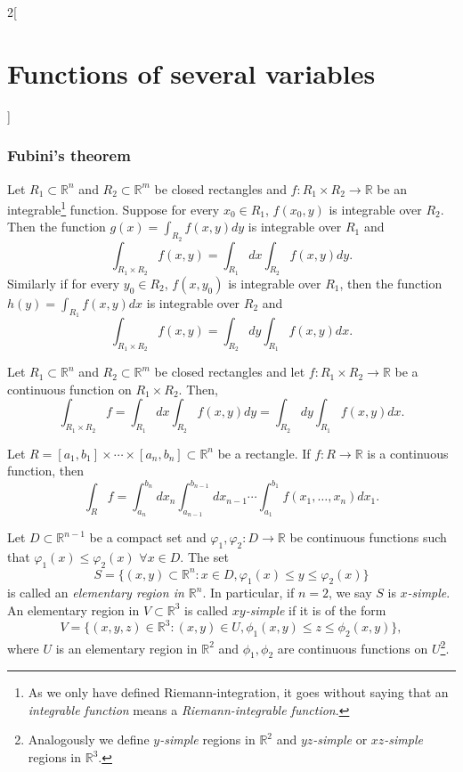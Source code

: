 \documentclass[class=article,10pt,crop=false]{standalone}
\begin{document}
\begin{multicols}{2}[\section{Functions of several variables}]
\subsubsection*{Fubini's theorem}
\begin{theorem}
Let $R_1\subset\mathbb{R}^n$ and $R_2\subset\mathbb{R}^m$ be closed rectangles and $f:R_1\times R_2\rightarrow\mathbb{R}$ be an integrable\footnote{As we only have defined Riemann-integration, it goes without saying that an \textit{integrable function} means a \textit{Riemann-integrable function}.} function. Suppose for every $x_0\in R_1$, $f(x_0,y)$ is integrable over $R_2$. Then the function $\displaystyle g(x)=\int_{R_2}f(x,y)dy$ is integrable over $R_1$ and $$\int_{R_1\times R_2}f(x,y)=\int_{R_1}dx\int_{R_2}f(x,y)dy.$$ Similarly if for every $y_0\in R_2$, $f(x,y_0)$ is integrable over $R_1$, then the function $\displaystyle h(y)=\int_{R_1}f(x,y)dx$ is integrable over $R_2$ and $$\int_{R_1\times R_2}f(x,y)=\int_{R_2}dy\int_{R_1}f(x,y)dx.$$
\begin{corollary}
Let $R_1\subset\mathbb{R}^n$ and $R_2\subset\mathbb{R}^m$ be closed rectangles and let $f:R_1\times R_2\rightarrow\mathbb{R}$ be a continuous function on $R_1\times R_2$. Then, $$\int_{R_1\times R_2}f=\int_{R_1}dx\int_{R_2}f(x,y)dy=\int_{R_2}dy\int_{R_1}f(x,y)dx.$$
\end{corollary}
\begin{corollary}
Let $R=[a_1,b_1]\times\cdots\times[a_n,b_n]\subset\mathbb{R}^n$ be a rectangle. If $f:R\rightarrow\mathbb{R}$ is a continuous function, then $$\int_Rf=\int_{a_n}^{b_n}dx_n\int_{a_{n-1}}^{b_{n-1}}dx_{n-1}\cdots\int_{a_1}^{b_1}f(x_1,\ldots,x_n)dx_1.$$
\end{corollary}
\begin{definition}
Let $D\subset\mathbb{R}^{n-1}$ be a compact set and $\varphi_1,\varphi_2:D\rightarrow\mathbb{R}$ be continuous functions such that $\varphi_1(x)\leq\varphi_2(x)$ $\forall x\in D$. The set $$S=\{(x,y)\subset\mathbb{R}^n:x\in D, \varphi_1(x)\leq y\leq\varphi_2(x)\}$$ is called an \textit{elementary region in $\mathbb{R}^n$}. In particular, if $n=2$, we say $S$ is \textit{$x$-simple}. An elementary region in $V\subset\mathbb{R}^3$ is called \textit{$xy$-simple} if it is of the form $$V=\{(x,y,z)\in\mathbb{R}^3:(x,y)\in U, \phi_1(x,y)\leq z\leq\phi_2(x,y)\},$$ where $U$ is an elementary region in $\mathbb{R}^2$ and $\phi_1,\phi_2$ are continuous functions on $U$\footnote{Analogously we define \textit{$y$-simple} regions in $\mathbb{R}^2$ and \textit{$yz$-simple} or \textit{$xz$-simple} regions in $\mathbb{R}^3$.}.

\end{definition}
\end{theorem}
\end{multicols}
\end{document}
